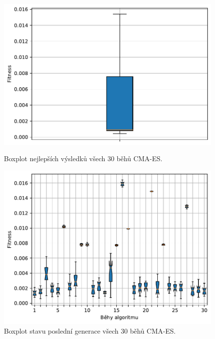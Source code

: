 \begin{figure}[H]
\begin{minipage}[t]{0.475\linewidth}
\includegraphics[width=\linewidth]{obrazky-figures/statistics/Benchmarks/Griewank/CMAES/bestsBoxplot_WithOutliers.pdf}
\caption{Boxplot nejlepších výsledků všech $30$ běhů CMA-ES.}
\label{fg:bench:griewank:pso:best}
\end{minipage}
\hfill
\begin{minipage}[t]{0.475\linewidth}
\includegraphics[width=\linewidth]{obrazky-figures/statistics/Benchmarks/Griewank/CMAES/lastGenBoxplots.pdf}
\caption{Boxplot stavu poslední generace všech $30$ běhů CMA-ES.}
\label{fg:bench:griewank:pso:lastGen}
\end{minipage}
\end{figure}

